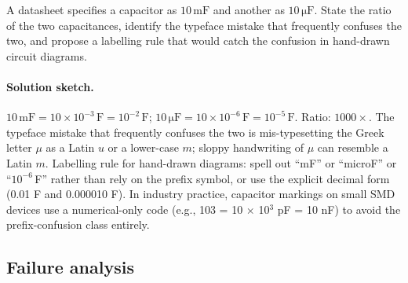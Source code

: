 \begin{exercise}
A datasheet specifies a capacitor as $10 \,\mathrm{mF}$ and another
as $10 \,\mathrm{\mu F}$. State the ratio of the two capacitances,
identify the typeface mistake that frequently confuses the two, and
propose a labelling rule that would catch the confusion in
hand-drawn circuit diagrams.

\paragraph{Solution sketch.}
$10 \,\mathrm{mF} = 10 \times 10^{-3} \,\si{\farad} = 10^{-2} \,\si
{\farad}$; $10 \,\mathrm{\mu F} = 10 \times 10^{-6} \,\si{\farad}
= 10^{-5} \,\si{\farad}$. Ratio: $1000\times$. The typeface mistake
that frequently confuses the two is mis-typesetting the Greek
letter $\mu$ as a Latin $u$ or a lower-case $m$; sloppy handwriting
of $\mu$ can resemble a Latin $m$. Labelling rule for hand-drawn
diagrams: spell out ``mF'' or ``microF'' or ``$10^{-6}\,$F'' rather
than rely on the prefix symbol, or use the explicit decimal form
(0.01 F and 0.000010 F). In industry practice, capacitor markings
on small SMD devices use a numerical-only code (e.g., 103 = 10
$\times$ 10$^{3}$ pF = 10 nF) to avoid the prefix-confusion class
entirely.
\end{exercise}

\subsection*{Failure analysis}

